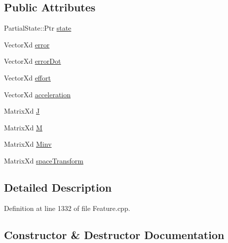\subsection*{Public Attributes}
\begin{DoxyCompactItemize}
\item 
Partial\+State\+::\+Ptr \hyperlink{structocra_1_1PartialStateFeature_1_1Pimpl_a780cc4ecc5de8f231684ffdd394aa31a}{state}
\item 
Vector\+Xd \hyperlink{structocra_1_1PartialStateFeature_1_1Pimpl_a92618339173100da4f1759fca1c5de69}{error}
\item 
Vector\+Xd \hyperlink{structocra_1_1PartialStateFeature_1_1Pimpl_a761ba2024bc9792be9d3317ac0e7006e}{error\+Dot}
\item 
Vector\+Xd \hyperlink{structocra_1_1PartialStateFeature_1_1Pimpl_a9339429835a3f17dc250ebcb1a417de8}{effort}
\item 
Vector\+Xd \hyperlink{structocra_1_1PartialStateFeature_1_1Pimpl_a513530c5f57ebdd9b49fe5c7af683378}{acceleration}
\item 
Matrix\+Xd \hyperlink{structocra_1_1PartialStateFeature_1_1Pimpl_aa1bea74398a6c6774e4178c9a07585fc}{J}
\item 
Matrix\+Xd \hyperlink{structocra_1_1PartialStateFeature_1_1Pimpl_a72c1103a7217a32b0c3a987ee55ae4b8}{M}
\item 
Matrix\+Xd \hyperlink{structocra_1_1PartialStateFeature_1_1Pimpl_a7e2b177fca112bbeb8055361c90d333e}{Minv}
\item 
Matrix\+Xd \hyperlink{structocra_1_1PartialStateFeature_1_1Pimpl_aadd03df1276aa00d2efd8679c5cecb1a}{space\+Transform}
\end{DoxyCompactItemize}


\subsection{Detailed Description}


Definition at line 1332 of file Feature.\+cpp.



\subsection{Constructor \& Destructor Documentation}
\hypertarget{structocra_1_1PartialStateFeature_1_1Pimpl_ab528ba7c9763bcdee5e89cca9a18defd}{}\label{structocra_1_1PartialStateFeature_1_1Pimpl_ab528ba7c9763bcdee5e89cca9a18defd} 
